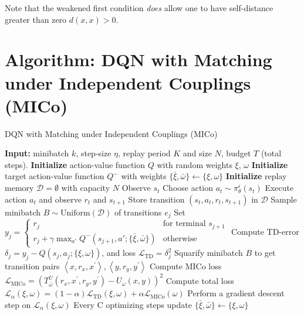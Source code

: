 Note that the weakened first condition \emph{does} allow one to have self-distance greater than zero $d(x,x) > 0$.

\section{Algorithm: DQN with Matching under Independent Couplings (MICo)}
\label{append:dqn_mico}

\begin{algorithm}[H]
\caption{DQN with Matching under Independent Couplings (MICo)}
\label{algorithm:dqn_mico}
\begin{algorithmic}[1]
\State \textbf{Input:} minibatch $k$, step-size $\eta$, replay period $K$ and size $N$, budget $T$ (total steps).
\State \textbf{Initialize} action-value function $Q$ with random weights $\xi$, $\omega$
\State \textbf{Initialize} target action-value function $Q^-$ with weights $\{\bar{\xi},\bar{\omega}\} \leftarrow \{\xi, \omega\}$
\State \textbf{Initialize} replay memory $\mathcal{D} = \emptyset$ with capacity $N$%
    \State Observe $s_t$
    \State Choose action $a_t \sim \pi^\epsilon_\theta(s_t)$
    \State Execute action $a_t$ and observe $r_t$ and $s_{t+1}$
    \State Store transition $(s_t, a_t, r_t, s_{t+1})$ in $\mathcal{D}$
        \State Sample minibatch $B \sim \text{Uniform}(\mathcal{D})$ of transitions $e_j$        %
        \State Set $y_j = 
        \begin{cases} 
            r_j & \text{for terminal } s_{j+1}\\
            r_j + \gamma \max_{a'} Q^-(s_{j+1}, a'; \{\bar{\xi},\bar{\omega}\}) & \text{otherwise}
        \end{cases}$
        \State Compute TD-error $\delta_j = y_j - Q(s_{j}, a_{j}; \{\xi, \omega\})$, and loss $\mathcal{L}_{\text{TD}} = \delta_j^2 $
        \State Squarify minibatch $B$ to get transition pairs $\left\langle x, r_x, x^{\prime}\right\rangle,\left\langle y, r_y, y^{\prime}\right\rangle$ 
        \State Compute MICo loss $\mathcal{L}_{\text{MICo}} = \left(T_{\bar{\omega}}^U\left(r_x, x^{\prime}, r_y, y^{\prime}\right)-U_\omega(x, y)\right)^2$
        \State Compute total loss $\mathcal{L}_\alpha(\xi, \omega) = (1 - \alpha) \mathcal{L}_{\text{TD}}(\xi, \omega) + \alpha \mathcal{L}_{\text{MICo}}(\omega)$
        \State Perform a gradient descent step on $\mathcal{L}_\alpha(\xi, \omega)$
        \State Every C optimizing steps update $\{\bar{\xi},\bar{\omega}\} \leftarrow \{\xi, \omega\}$
        


\end{algorithmic}
\end{algorithm}
